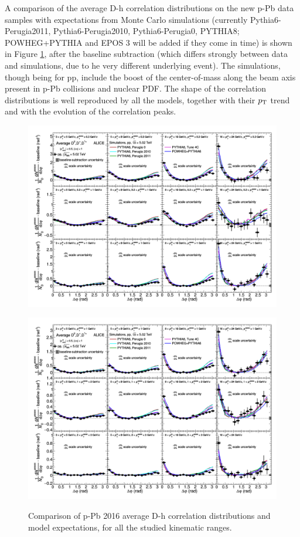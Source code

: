 A comparison of the average D-h correlation distributions on the new p-Pb data samples with expectations from Monte Carlo simulations (currently Pythia6-Perugia2011, Pythia6-Perugia2010, Pythia6-Perugia0, PYTHIA8; POWHEG+PYTHIA and EPOS 3 will be added if they come in time) is shown in Figure \ref{fig:CfrAverageModel}, after the baseline subtraction (which differs strongly between data and simulations, due to he very different underlying event). The simulations, though being for pp, include the boost of the center-of-mass along the beam axis present in p-Pb collisions and nuclear PDF. The shape of the correlation distributions is well reproduced by all the models, together with their $p_{\rm T}$ trend and with the evolution of the correlation peaks.

\begin{figure}[!htbp]
\centering
{\includegraphics[width=1.3\textwidth, angle=90]{figures/CfrPPandModels/CorrelationppMC4x6_1New.png}}
\end{figure}
\begin{figure}[!htbp]
\centering
{\includegraphics[width=1.3\textwidth, angle=90]{figures/CfrPPandModels/CorrelationppMC4x6_2New.png}}
\caption{Comparison of p-Pb 2016 average D-h correlation distributions and model expectations, for all the studied kinematic ranges.}
\label{fig:CfrAverageModel}
\end{figure}

